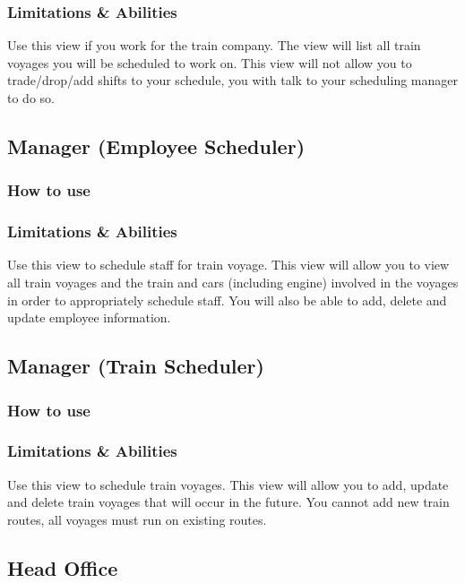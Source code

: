 \documentclass[letter]{article}
\begin{document}
\subsubsection{Limitations \& Abilities}
Use this view if you work for the train company. The view will list all train voyages you will be scheduled to work on.  This view will not allow you to trade/drop/add shifts to your schedule, you with talk to your scheduling manager  to do so.


\subsection{Manager (Employee Scheduler)}
\subsubsection{How to use}

\subsubsection{Limitations \& Abilities}
Use this view to schedule staff for train voyage. This view will allow you to view all train voyages and the train and cars (including engine) involved in the voyages in order to appropriately schedule staff. You will also be able to add, delete and update employee information.


\subsection{Manager (Train Scheduler)}
\subsubsection{How to use}

\subsubsection{Limitations \& Abilities}
Use this view to schedule train voyages. This view will allow you to add, update and delete train voyages that will occur in the future. You cannot add new train routes, all voyages must run on existing routes. 


\subsection{Head Office}
\end{document}
